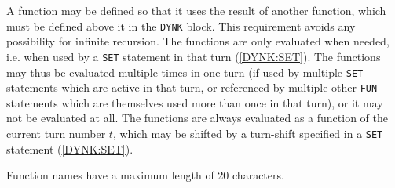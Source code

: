 A function may be defined so that it uses the result of another function, which must be defined above it in the \texttt{DYNK} block.
This requirement avoids any possibility for infinite recursion.
The functions are only evaluated when needed, i.e. when used by a \texttt{SET} statement in that turn (\ref{DYNK:SET}).
The functions may thus be evaluated multiple times in one turn (if used by multiple \texttt{SET} statements which are active in that turn, or referenced by multiple other \texttt{FUN} statements which are themselves used more than once in that turn), or it may not be evaluated at all.
The functions are always evaluated as a function of the current turn number $t$, which may be shifted by a turn-shift specified in a \texttt{SET} statement (\ref{DYNK:SET}).

Function names have a maximum length of 20 characters.


